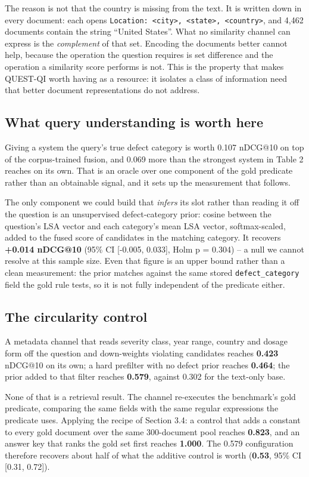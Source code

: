 \documentclass[runningheads]{llncs}
\begin{document}
The reason is not that the country is missing from the text. It is written down in every document: each opens \texttt{Location: <city>, <state>, <country>}, and 4,462 documents contain the string ``United States''. What no similarity channel can express is the \textit{complement} of that set. Encoding the documents better cannot help, because the operation the question requires is set difference and the operation a similarity score performs is not. This is the property that makes QUEST-QI worth having as a resource: it isolates a class of information need that better document representations do not address.


\subsection{What query understanding is worth here}
Giving a system the query's true defect category is worth 0.107 nDCG@10 on top of the corpus-trained fusion, and 0.069 more than the strongest system in Table 2 reaches on its own. That is an oracle over one component of the gold predicate rather than an obtainable signal, and it sets up the measurement that follows.

The only component we could build that \textit{infers} its slot rather than reading it off the question is an unsupervised defect-category prior: cosine between the question's LSA vector and each category's mean LSA vector, softmax-scaled, added to the fused score of candidates in the matching category. It recovers \textbf{+0.014 nDCG@10} (95\% CI [-0.005, 0.033], Holm p = 0.304) -- a null we cannot resolve at this sample size. Even that figure is an upper bound rather than a clean measurement: the prior matches against the same stored \texttt{defect\_category} field the gold rule tests, so it is not fully independent of the predicate either.


\subsection{The circularity control}
A metadata channel that reads severity class, year range, country and dosage form off the question and down-weights violating candidates reaches \textbf{0.423} nDCG@10 on its own; a hard prefilter with no defect prior reaches \textbf{0.464}; the prior added to that filter reaches \textbf{0.579}, against 0.302 for the text-only base.

None of that is a retrieval result. The channel re-executes the benchmark's gold predicate, comparing the same fields with the same regular expressions the predicate uses. Applying the recipe of Section 3.4: a control that adds a constant to every gold document over the same 300-document pool reaches \textbf{0.823}, and an answer key that ranks the gold set first reaches \textbf{1.000}. The 0.579 configuration therefore recovers about half of what the additive control is worth (\textbf{0.53}, 95\% CI [0.31, 0.72]).
\end{document}
